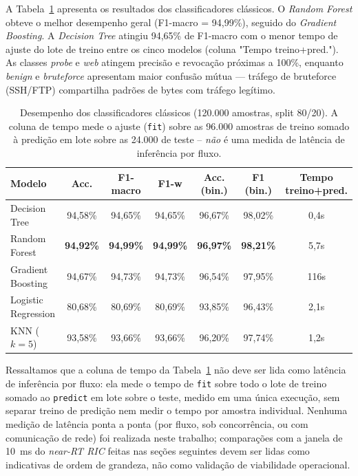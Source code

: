 \documentclass[12pt]{article}
\begin{document}
A Tabela~\ref{tab:classico} apresenta os resultados dos classificadores clássicos. O \textit{Random Forest} obteve o melhor desempenho geral (F1-macro = 94,99\%), seguido do \textit{Gradient Boosting}. A \textit{Decision Tree} atingiu 94,65\% de F1-macro com o menor tempo de ajuste do lote de treino entre os cinco modelos (coluna "Tempo treino+pred."). As classes \textit{probe} e \textit{web} atingem precisão e revocação próximas a 100\%, enquanto \textit{benign} e \textit{bruteforce} apresentam maior confusão mútua — tráfego de bruteforce (SSH/FTP) compartilha padrões de bytes com tráfego legítimo.

\begin{table}[H]
\centering
\caption{Desempenho dos classificadores clássicos (120.000 amostras, split 80/20). A coluna de tempo mede o ajuste (\texttt{fit}) sobre as 96.000 amostras de treino somado à predição em lote sobre as 24.000 de teste -- \emph{não} é uma medida de latência de inferência por fluxo.}
\label{tab:classico}
\small
\begin{tabular}{lcccccc}
\toprule
\textbf{Modelo} & \textbf{Acc.} & \textbf{F1-macro} & \textbf{F1-w} & \textbf{Acc. (bin.)} & \textbf{F1 (bin.)} & \textbf{Tempo treino+pred.} \\
\midrule
Decision Tree       & 94,58\% & 94,65\% & 94,65\% & 96,67\% & 98,02\% & 0,4s \\
Random Forest       & \textbf{94,92\%} & \textbf{94,99\%} & \textbf{94,99\%} & \textbf{96,97\%} & \textbf{98,21\%} & 5,7s \\
Gradient Boosting   & 94,67\% & 94,73\% & 94,73\% & 96,54\% & 97,95\% & 116s \\
Logistic Regression & 80,68\% & 80,69\% & 80,69\% & 93,85\% & 96,43\% & 2,1s \\
KNN ($k=5$)         & 93,58\% & 93,66\% & 93,66\% & 96,20\% & 97,74\% & 1,2s \\
\bottomrule
\end{tabular}
\end{table}

Ressaltamos que a coluna de tempo da Tabela~\ref{tab:classico} não deve ser lida como latência de inferência por fluxo: ela mede o tempo de \texttt{fit} sobre todo o lote de treino somado ao \texttt{predict} em lote sobre o teste, medido em uma única execução, sem separar treino de predição nem medir o tempo por amostra individual. Nenhuma medição de latência ponta a ponta (por fluxo, sob concorrência, ou com comunicação de rede) foi realizada neste trabalho; comparações com a janela de 10~ms do \textit{near-RT RIC} feitas nas seções seguintes devem ser lidas como indicativas de ordem de grandeza, não como validação de viabilidade operacional.
\end{document}
